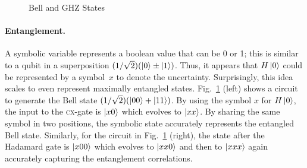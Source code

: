 \documentclass[sigplan]{acmart}
\newcommand{\cx}{\textsc{cx}}
\begin{document}
\begin{figure}[ht]
\begin{center}
\qquad
{}
\end{center}
\caption{\label{fig:bell2}Bell and GHZ States}
\end{figure}
\paragraph*{Entanglement.}
A symbolic variable represents a boolean value that can be 0 or 1;
this is similar to a qubit in a superposition $(1/\sqrt{2}) (\ket{0}
\pm \ket{1})$. Thus, it appears that $H\ket{0}$ could be represented
by a symbol~$x$ to denote the uncertainty. Surprisingly, this idea
scales to even represent maximally entangled
states. Fig.~\ref{fig:bell2} (left) shows a circuit to generate the Bell
state $(1/\sqrt{2}) (\ket{00} + \ket{11})$. By using the symbol $x$
for $H\ket{0}$, the input to the \cx-gate is $\ket{x0}$ which
evolves to $\ket{xx}$. By sharing the same symbol in two positions,
the symbolic state accurately represents the entangled Bell
state. Similarly, for the circuit in Fig.~\ref{fig:bell2} (right), the
state after the Hadamard gate is $\ket{x00}$ which evolves to
$\ket{xx0}$ and then to $\ket{xxx}$ again accurately capturing the
entanglement correlations.
\end{document}
